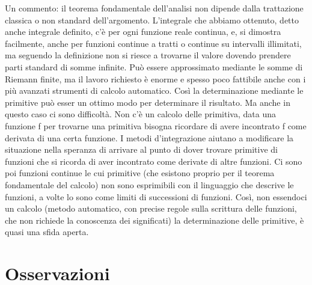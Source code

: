 Un commento: il teorema fondamentale dell'analisi non dipende dalla 
trattazione classica o non standard dell'argomento. L'integrale che abbiamo 
ottenuto, detto anche integrale definito, c'è per ogni funzione reale 
continua, e, si dimo­stra facilmente, anche per funzioni continue a tratti o 
continue su intervalli illimitati, ma seguendo la definizione non si riesce a 
trovarne il valore dovendo prendere parti standard di somme infinite. Può 
essere approssimato mediante le somme di Riemann finite, ma il lavoro 
richiesto è enorme e spesso poco fattibile anche con i più avanzati strumenti 
di calcolo automatico. 
Così la determinazione mediante le primitive può esser un ottimo modo per 
determinare il risultato. Ma anche in questo caso ci sono difficoltà. Non c'è 
un calcolo delle primitiva, data una funzione f per trovarne una primitiva 
bisogna ricordare di avere incontrato f come derivata di una certa funzione. 
I metodi d'integrazione aiutano a modificare la situazione nella speranza di 
arrivare al punto di dover trovare primitive di funzioni che si ricorda di 
aver incontrato come derivate di altre funzioni. Ci sono poi funzioni 
continue le cui primitive (che esistono proprio per il teorema fondamentale 
del calcolo) non sono esprimibili con il linguaggio che descrive le 
funzioni, a volte lo sono come limiti di successioni di funzioni. Così, non 
essendoci un calcolo (metodo automatico, con precise regole sulla scrittura 
delle funzioni, che non richiede la conoscenza dei significati) la 
determinazione delle primitive, è quasi una sfida aperta.

\section{Osservazioni}

